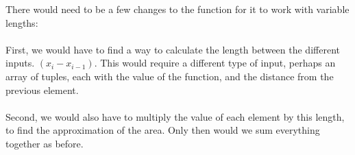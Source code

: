 There would need to be a few changes to the function for it to work with variable lengths:\\
\\
First, we would have to find a way to calculate the length between the different inputs. $(x_i-x_{i-1})$. This would require a different type of input, perhaps an array of tuples, each with the value of the function, and the distance from the previous element.\\\\
Second, we would also have to multiply the value of each element by this length, to find the approximation of the area. Only then would we sum everything together as before.